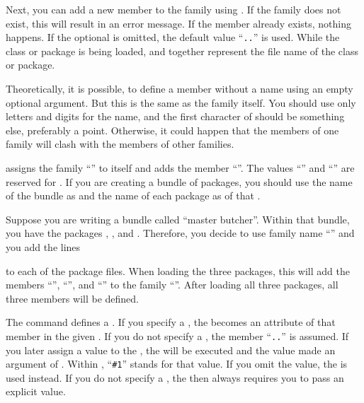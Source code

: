 Next, you can add a new member to the family using .
If the family does not exist, this will result in an error message. If the
member already exists, nothing happens. If the optional  is
omitted, the default value
``\texttt{.}\texttt{.}'' is used. While
the class or package is being loaded,  and 
together represent the file name of the class or package.

Theoretically, it is possible, to define a member without a name using an
empty optional  argument. But this is the same as the family
itself. You should use only letters and digits for the  name,
and the first character of  should be something else, preferably
a point. Otherwise, it could happen that the members of one family will clash
with the members of other families.

 assigns the family ``'' to itself and adds the
member ``''. The values ``'' and
``'' are reserved for \KOMAScript{}. If you are creating a
bundle of packages, you should use the name of the bundle as 
and the name of each package as  of that .
%
\begin{Example}
  Suppose you are writing a bundle called ``master butcher''. Within that
  bundle, you have the packages , ,
  and . Therefore, you decide to use family name
  ``'' and you add the lines
\begin{lstcode}
\end{lstcode}
  to each of the package files. When loading the three packages, this will
  add the members ``'', ``'',
  and ``'' to the family ``''. After
  loading all three packages, all three members will be defined.
\end{Example}
%
\EndIndexGroup


\begin{Declaration}
\end{Declaration}
The  command defines a . If you specify a
, the  becomes an attribute of that member in the
given . If you do not specify a , the member
``\texttt{.}\texttt{.}'' is assumed. If you
later assign a value to the , the  will be
executed and the value made an argument of . Within
, ``\lstinline{#1}'' stands for that value. If you omit the value,
the  is used instead. If you do not specify a ,
the  then always requires you to pass an explicit value.

